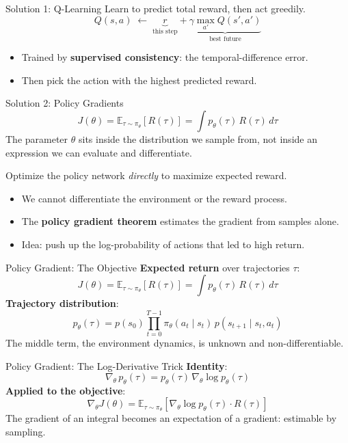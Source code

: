 \documentclass[aspectratio=169]{beamer}
\begin{document}
\begin{frame}{Solution 1: Q-Learning}
Learn to predict total reward, then act greedily.
\[
Q(s,a) \;\leftarrow\; \underbrace{r}_{\text{this step}} + \underbrace{\gamma \max_{a'} Q(s', a')}_{\text{best future}}
\]
\begin{itemize}
\item Trained by \textbf{supervised consistency}: the temporal-difference error.
\item Then pick the action with the highest predicted reward.
\end{itemize}
\end{frame}

\begin{frame}{Solution 2: Policy Gradients}
\[
J(\theta) = \mathbb{E}_{\tau \sim \pi_\theta}\!\left[ R(\tau) \right] = \int p_\theta(\tau)\, R(\tau)\, d\tau
\]
The parameter $\theta$ sits inside the distribution we sample from, not inside an expression we can evaluate and differentiate.
\vspace{0.5em}

Optimize the policy network \emph{directly} to maximize expected reward.
\begin{itemize}
\item We cannot differentiate the environment or the reward process.
\item The \textbf{policy gradient theorem} estimates the gradient from samples alone.
\item Idea: push up the log-probability of actions that led to high return.
\end{itemize}
\end{frame}

\begin{frame}{Policy Gradient: The Objective}
\textbf{Expected return} over trajectories $\tau$:
\[
J(\theta) = \mathbb{E}_{\tau \sim \pi_\theta}\!\left[ R(\tau) \right] = \int p_\theta(\tau)\, R(\tau)\, d\tau
\]
\textbf{Trajectory distribution}:
\[
p_\theta(\tau) = p(s_0) \prod_{t=0}^{T-1} \pi_\theta(a_t \mid s_t)\, p(s_{t+1} \mid s_t, a_t)
\]
The middle term, the environment dynamics, is unknown and non-differentiable.
\end{frame}

\begin{frame}{Policy Gradient: The Log-Derivative Trick}
\textbf{Identity}:
\[
\nabla_\theta\, p_\theta(\tau) = p_\theta(\tau)\, \nabla_\theta \log p_\theta(\tau)
\]
\textbf{Applied to the objective}:
\[
\nabla_\theta J(\theta) = \mathbb{E}_{\tau \sim \pi_\theta}\!\left[ \nabla_\theta \log p_\theta(\tau) \cdot R(\tau) \right]
\]
The gradient of an integral becomes an expectation of a gradient: estimable by sampling.
\end{frame}
\end{document}
